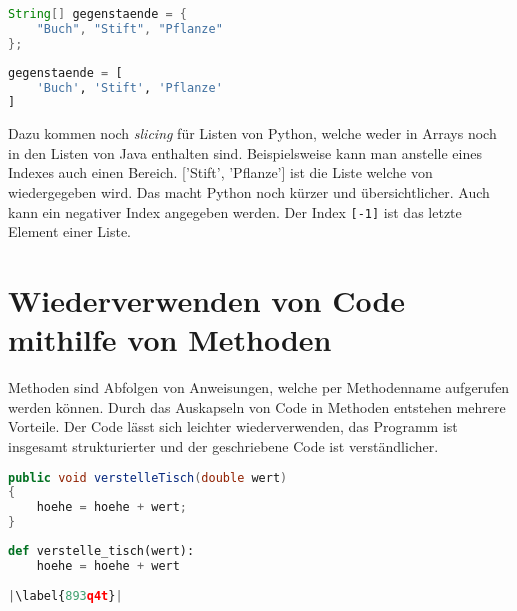 \begin{minipage}{.5\linewidth}
\begin{lstlisting}[language=java,caption={Einfache Deklarierung Java},captionpos=b,label={lst:java:ezarray},frame=none]
String[] gegenstaende = {
    "Buch", "Stift", "Pflanze"
};
\end{lstlisting}
\end{minipage}
\begin{minipage}{.5\linewidth}
\begin{lstlisting}[language=python,caption={Einfach Deklarierung Python},captionpos=b,label={lst:python:ezarray},frame=l]
gegenstaende = [
    'Buch', 'Stift', 'Pflanze'
]
\end{lstlisting}
\end{minipage}

Dazu kommen noch \textit{slicing} für Listen von Python, welche weder in Arrays noch in den Listen von Java enthalten sind. Beispielsweise kann man anstelle eines Indexes auch einen Bereich. ['Stift', 'Pflanze'] ist die Liste welche von  wiedergegeben wird. Das macht Python noch kürzer und übersichtlicher. Auch kann ein negativer Index angegeben werden. Der Index \texttt{[-1]} ist das letzte Element einer Liste.\par

\section{Wiederverwenden von Code mithilfe von Methoden}
Methoden sind Abfolgen von Anweisungen, welche per Methodenname aufgerufen werden können. Durch das Auskapseln von Code in Methoden entstehen mehrere Vorteile. Der Code lässt sich leichter wiederverwenden, das Programm ist insgesamt strukturierter und der geschriebene Code ist verständlicher. \cite{Python3:Buch}\cite{Louis:2010}

\begin{minipage}{.5\linewidth}
\begin{lstlisting}[language=java,caption={Methoden in Java},captionpos=b,label={lst:java:methode},frame=none]
public void verstelleTisch(double wert)
{
    hoehe = hoehe + wert;
}
\end{lstlisting}
\end{minipage}
\begin{minipage}{.5\linewidth}
\begin{lstlisting}[language=python,caption={Methode in Python},captionpos=b,label={lst:python:methode},frame=l,escapechar=|]
def verstelle_tisch(wert):
    hoehe = hoehe + wert
    
|\label{893q4t}|
\end{lstlisting}
\end{minipage}

